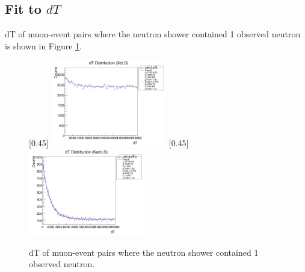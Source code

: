\documentclass[12pt,letterpaper]{article}
\begin{document}
\subsection*{Fit to $dT$}
dT of muon-event pairs where the neutron shower contained 1 observed neutron is shown in Figure \ref{fig:dT_fits}.
\begin{figure}[ht]
	\centering
	[0.45\textwidth]{
		\includegraphics[width=0.45\textwidth]{dT_distribution_allcuts_XeLS.png}}
	\hfill
	[0.45\textwidth]{
		\includegraphics[width=0.45\textwidth]{dT_distribution_allcuts_KamLS.png}}
	\caption{dT of muon-event pairs where the neutron shower contained 1 observed neutron.}
	\label{fig:dT_fits}
\end{figure}
\end{document}
